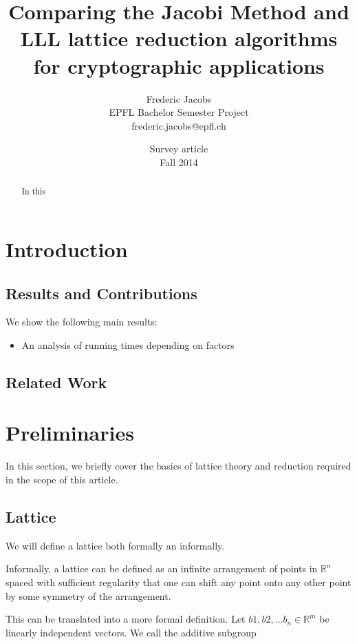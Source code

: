 \documentclass[10pt]{article}
\title{Comparing the Jacobi Method and LLL lattice reduction algorithms for cryptographic applications}
\date{Survey article\\ Fall 2014}
\author{Frederic Jacobs\\ EPFL Bachelor Semester Project\\ frederic.jacobs@epfl.ch}
\begin{document}
\maketitle

\begin{abstract}
In this \cite{originalJacobiMethodLatticeBasisReduction}
\end{abstract}

\section{Introduction}


\subsection{Results and Contributions}

We show the following main results:
\begin{itemize}
\item An analysis of running times depending on factors
\end{itemize}


\subsection{Related Work}

\section{Preliminaries}

In this section, we briefly cover the basics of lattice theory and reduction required in the scope of this article.

\subsection{Lattice}

We will define a lattice both formally an informally. 

Informally\cite{lllAlgorithm}, a lattice can be defined as an infinite arrangement of points in $\mathbb{R}^n$ spaced with sufficient regularity that one can shift any point onto any other point by some symmetry of the arrangement.

This can be translated into a more formal definition\cite{SchnorrStanfordNotes}.\newline 
Let $b1, b2, ... b_n \in \mathbb{R}^m$ be linearly independent vectors. We call the additive subgroup
\end{document}
